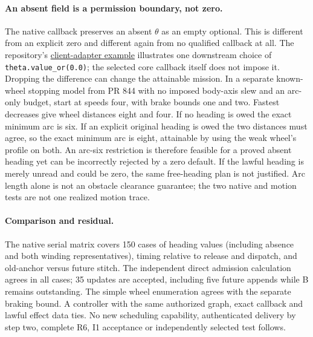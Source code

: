 \documentclass{article}
\begin{document}
\paragraph{An absent field is a permission boundary, not zero.}
The native callback preserves an absent \(\theta\) as an empty
optional. This is different from an explicit zero and different
again from no qualified callback at all. The repository's
\href{https://github.com/ros-industrial/vda5050_core/blob/a81ff9d600e8e30a35af25c152a3445c29c12f5f/docs/client-adapter.md}{client-adapter example}
illustrates one downstream choice of \texttt{theta.value\_or(0.0)};
the selected core callback itself does not impose it.
Dropping the difference can change the attainable mission.
In a separate known-wheel stopping model from PR 844 with
no imposed body-axis slew and an arc-only budget, start at speeds
four, with brake bounds one and two. Fastest decreases give wheel
distances eight and four. If no heading is owed the exact minimum
arc is six. If an explicit original heading is owed the two
distances must agree, so the exact minimum arc is eight,
attainable by using the weak wheel's profile on both.
An arc-six restriction is therefore feasible for a proved absent
heading yet can be incorrectly rejected by a zero default.
If the lawful heading is merely unread and could be zero, the
same free-heading plan is not justified. Arc length alone is not
an obstacle clearance guarantee; the two native and motion tests
are not one realized motion trace.

\paragraph{Comparison and residual.}
The native serial matrix covers 150 cases of heading values
(including absence and both winding representatives), timing
relative to release and dispatch, and old-anchor versus future
stitch. The independent direct admission calculation agrees
in all cases; 35 updates are accepted, including five future
appends while B remains outstanding. The simple wheel enumeration
agrees with the separate braking bound. A controller with the
same authorized graph, exact callback and lawful effect data
ties. No new scheduling capability, authenticated delivery by
step two, complete R6, I1 acceptance or independently selected
test follows.
\end{document}
